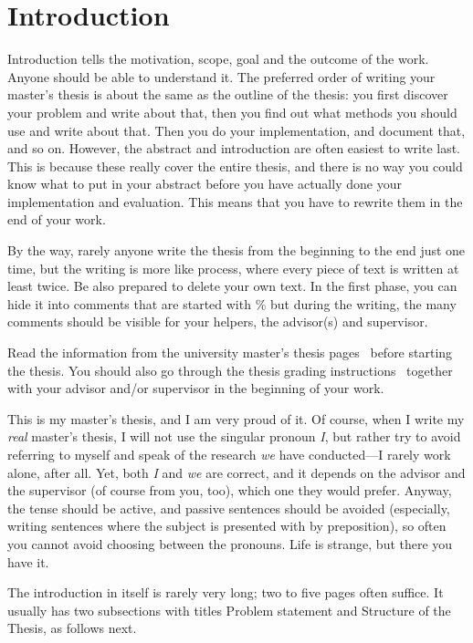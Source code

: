 \chapter{Introduction}
\label{chapter:intro}

Introduction tells the motivation, scope, goal and the outcome of the
work. Anyone should be able to understand it. The preferred order of
writing your master's thesis is about the same as the outline of the
thesis: you first discover your problem and write about that, then you
find out what methods you should use and write about that.  Then you
do your implementation, and document that, and so on.  However, the
abstract and introduction are often easiest to write last.  This is
because these really cover the entire thesis, and there is no way you
could know what to put in your abstract before you have actually done
your implementation and evaluation. This means that you have to
rewrite them in the end of your work.

By the way, rarely anyone write the thesis from the beginning to the
end just one time, but the writing is more like process, where every
piece of text is written at least twice. Be also prepared to delete
your own text. In the first phase, you can hide it into comments that
are started with \% but during the writing, the many comments should
be visible for your helpers, the advisor(s) and supervisor.

Read the information from the university master's thesis
pages~\cite{ThesisInstructions} before starting the thesis.  You
should also go through the thesis grading
instructions~\cite{ThesisGrading} together with your advisor and/or
supervisor in the beginning of your work.

This is my master's thesis, and I am very proud of it.  Of course,
when I write my \emph{real} master's thesis, I will not use the
singular pronoun \emph{I}, but rather try to avoid referring to myself
and speak of the research \emph{we} have conducted---I rarely work
alone, after all.  Yet, both \emph{I} and \emph{we} are correct, and
it depends on the advisor and the supervisor (of course from you,
too), which one they would prefer. Anyway, the tense should be active,
and passive sentences should be avoided (especially, writing sentences
where the subject is presented with by preposition), so often you
cannot avoid choosing between the pronouns. Life is strange, but there
you have it.

The introduction in itself is rarely very long; two to five pages
often suffice. It usually has two subsections with titles Problem
statement and Structure of the Thesis, as follows next.


